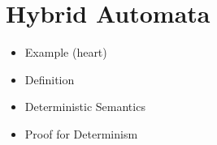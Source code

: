 \section{Hybrid Automata}
\label{sec:HA}

\begin{itemize}
	\item Example (heart)
	\item Definition
	\item Deterministic Semantics
	\item Proof for Determinism
\end{itemize}